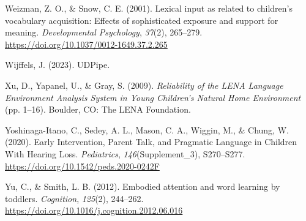 \documentclass[
  man,floatsintext]{apa6}
\newlength{\cslhangindent}
\newlength{\cslentryspacingunit} %
\newenvironment{CSLReferences}[2] %
 {%
  \setlength{\parindent}{0pt}
  \ifodd #1
  \let\oldpar\par
  \def\par{\hangindent=\cslhangindent\oldpar}
  \fi
  \setlength{\parskip}{#2\cslentryspacingunit}
 }%
 {}
\begin{document}
\begin{CSLReferences}{1}{0}
\leavevmode{}%
Weizman, Z. O., \& Snow, C. E. (2001). Lexical input as related to children's vocabulary acquisition: Effects of sophisticated exposure and support for meaning. \emph{Developmental Psychology}, \emph{37}(2), 265--279. \url{https://doi.org/10.1037/0012-1649.37.2.265}

\leavevmode{}%
Wijffels, J. (2023). {UDPipe}.

\leavevmode{}%
Xu, D., Yapanel, U., \& Gray, S. (2009). \emph{Reliability of the {LENA Language Environment Analysis System} in {Young Children}'s {Natural Home Environment}} (pp. 1--16). {Boulder, CO}: {The LENA Foundation}.

\leavevmode{}%
Yoshinaga-Itano, C., Sedey, A. L., Mason, C. A., Wiggin, M., \& Chung, W. (2020). Early {Intervention}, {Parent Talk}, and {Pragmatic Language} in {Children With Hearing Loss}. \emph{Pediatrics}, \emph{146}(Supplement\_3), S270--S277. \url{https://doi.org/10.1542/peds.2020-0242F}

\leavevmode{}%
Yu, C., \& Smith, L. B. (2012). Embodied attention and word learning by toddlers. \emph{Cognition}, \emph{125}(2), 244--262. \url{https://doi.org/10.1016/j.cognition.2012.06.016}

\end{CSLReferences}
\end{document}
